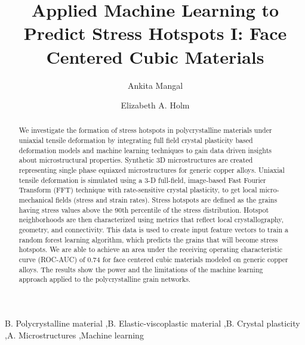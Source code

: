 \documentclass[preprint,1p,times,authoryear]{elsarticle}%
\begin{document}
\begin{frontmatter}
\title{Applied Machine Learning to Predict Stress Hotspots I: Face Centered Cubic Materials}%
\author[cmu]{Ankita Mangal}
\author[cmu]{Elizabeth A. Holm}

\address[cmu]{Department of Materials Science and Engineering, Carnegie Mellon University, 5000 Forbes Ave, Pittsburgh, PA 15213, USA}

\begin{abstract}
We investigate the formation of stress hotspots in polycrystalline materials under uniaxial tensile deformation by integrating full field crystal plasticity based deformation models and machine learning techniques to gain data driven insights about microstructural properties. Synthetic 3D microstructures are created representing single phase equiaxed microstructures for generic copper alloys. Uniaxial tensile deformation is simulated using a 3-D full-field, image-based Fast Fourier Transform (FFT) technique with rate-sensitive crystal plasticity, to get local micro-mechanical fields (stress and strain rates). Stress hotspots are defined as the grains having stress values above the 90th percentile of the stress distribution. Hotspot neighborhoods are then characterized using metrics that reflect local crystallography, geometry, and connectivity. This data is used to create input feature vectors to train a random forest learning algorithm, which predicts the grains that will become stress hotspots. We are able to achieve an area under the receiving operating characteristic curve (ROC-AUC) of 0.74 for face centered cubic materials modeled on generic copper alloys. The results show the power and the limitations of the machine learning approach applied to the polycrystalline grain networks.
\end{abstract}

\begin{keyword}
B. Polycrystalline material \sep B. Elastic-viscoplastic material \sep B. Crystal plasticity \sep A. Microstructures \sep Machine learning
\end{keyword}
\end{frontmatter}
\end{document}
